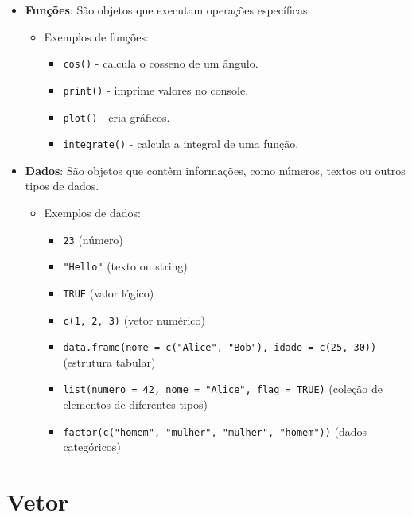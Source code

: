 \documentclass[
]{book}
\providecommand{\tightlist}{%
  \setlength{\itemsep}{0pt}\setlength{\parskip}{0pt}}
\begin{document}
\begin{itemize}
\item
  \textbf{Funções}: São objetos que executam operações específicas.

  \begin{itemize}
  \item
    Exemplos de funções:

    \begin{itemize}
    \tightlist
    \item
      \texttt{cos()} - calcula o cosseno de um ângulo.
    \item
      \texttt{print()} - imprime valores no console.
    \item
      \texttt{plot()} - cria gráficos.
    \item
      \texttt{integrate()} - calcula a integral de uma função.
    \end{itemize}
  \end{itemize}
\item
  \textbf{Dados}: São objetos que contêm informações, como números, textos
  ou outros tipos de dados.

  \begin{itemize}
  \item
    Exemplos de dados:

    \begin{itemize}
    \tightlist
    \item
      \texttt{23} (número)
    \item
      \texttt{"Hello"} (texto ou string)
    \item
      \texttt{TRUE} (valor lógico)
    \item
      \texttt{c(1,\ 2,\ 3)} (vetor numérico)
    \item
      \texttt{data.frame(nome\ =\ c("Alice",\ "Bob"),\ idade\ =\ c(25,\ 30))}
      (estrutura tabular)
    \item
      \texttt{list(numero\ =\ 42,\ nome\ =\ "Alice",\ flag\ =\ TRUE)} (coleção de
      elementos de diferentes tipos)
    \item
      \texttt{factor(c("homem",\ "mulher",\ "mulher",\ "homem"))} (dados
      categóricos)
    \end{itemize}
  \end{itemize}
\end{itemize}

\section{Vetor}\label{vetor}
\end{document}

